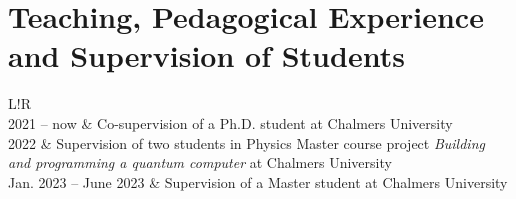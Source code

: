 \documentclass[11pt]{article}
\newcommand\VRule{\color{lightgray}\vrule width 0.5pt}
\begin{document}
	\section*{Teaching, Pedagogical Experience and Supervision of Students}
%	
%	
%	
	
	
	\vspace{0.5cm}
	\renewcommand{\arraystretch}{1.2}
	\begin{tabular}{L!{\VRule}R}
		\hline
		 \\
		\hline
		2021 -- now & Co-supervision of a Ph.D. student at Chalmers University \\
		2022 & Supervision of two students in Physics Master course project \emph{Building and programming a quantum computer} at Chalmers University \\
		Jan. 2023 -- June 2023 & Supervision of a Master student at Chalmers University \\
		\bottomrule
	\end{tabular}
	
\end{document}
